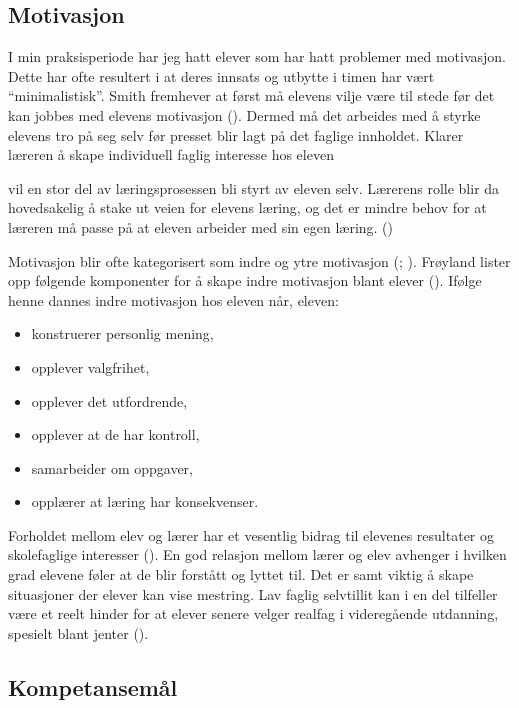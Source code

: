 \documentclass[main.tex]{subfiles}
\begin{document}
\subsection*{Motivasjon}

I min praksisperiode har jeg hatt elever som har hatt problemer med motivasjon. Dette har ofte resultert i at deres innsats og utbytte i timen har vært ``minimalistisk''. Smith fremhever at først må elevens vilje være til stede før det kan jobbes med elevens motivasjon (). Dermed må det arbeides med å styrke elevens tro på seg selv før presset blir lagt på det faglige innholdet. Klarer læreren å skape individuell faglig interesse hos eleven 
\begin{displayquote}
\textelp{} vil en stor del av læringsprosessen bli styrt av eleven selv. Lærerens rolle blir da hovedsakelig å stake ut veien for elevens læring, og det er mindre behov for at læreren må passe på at eleven arbeider med sin egen læring. \newline ()
\end{displayquote} 
Motivasjon blir ofte kategorisert som indre og ytre motivasjon (; ). Frøyland lister opp følgende komponenter for å skape indre motivasjon blant elever (). Ifølge henne dannes indre motivasjon hos eleven når, eleven:
\begin{itemize}
\item konstruerer personlig mening, 
\item opplever valgfrihet,
\item opplever det utfordrende,
\item opplever at de har kontroll,
\item samarbeider om oppgaver,
\item opplærer at læring har konsekvenser.
\end{itemize}
Forholdet mellom elev og lærer har et vesentlig bidrag til elevenes resultater og skolefaglige interesser (). En god relasjon mellom lærer og elev avhenger i hvilken grad elevene føler at de blir forstått og lyttet til. Det er samt viktig å skape situasjoner der elever kan vise mestring. Lav faglig selvtillit kan i en del tilfeller være et reelt hinder for at elever senere velger realfag i videregående utdanning, spesielt blant jenter ().

\subsection*{Kompetansemål}
\end{document}
